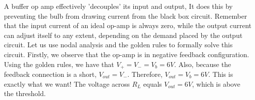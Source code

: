 \begin{enumerate}
{A buffer op amp effectively 'decouples' its input and output,
It does this by preventing the bulb from drawing current from the black box circuit. Remember that the input current of an ideal op-amp is always zero, while the output current can adjust itself to any extent, depending on the demand placed by the output circuit. Let us use nodal analysis and the golden rules to formally solve this circuit.
Firstly, we observe that the op-amp is in negative feedback configuration. Using the golden rules, we have that $V_+ = V_- = V_b = 6V$. Also, because the feedback connection is a short, $V_{out} = V_-$. Therefore, $V_{out} = V_b = 6V$. This is exactly what we want! The voltage across $R_L$  equals $V_{out} = 6V$, which is above the threshold.
}
\end{enumerate}